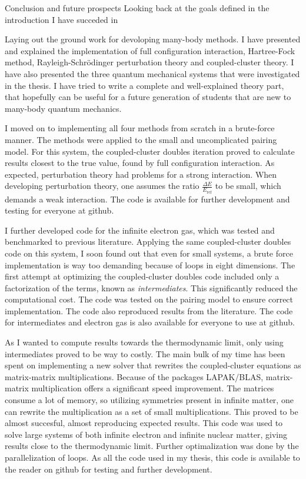 \documentclass[twoside,english]{uiofysmaster}
\begin{document}
\begin{chapter}{Conclusion and future prospects}
	Looking back at the goals defined in the introduction I have succeded in 

	Laying out the ground work for devoloping many-body methods. I have presented and explained the implementation of full configuration interaction, Hartree-Fock method, Rayleigh-Schr\"{o}dinger perturbation theory and coupled-cluster theory. I have also presented the three quantum mechanical systems that were investigated in the thesis. I have tried to write a complete and well-explained theory part, that hopefully can be useful for a future generation of students that are new to many-body quantum mechanics.  
 
	I moved on to implementing all four methods from scratch in a brute-force manner. The methods were applied to the small and uncomplicated pairing model. For this system, the coupled-cluster doubles iteration proved to calculate results closest to the true value, found by full configuration interaction. As expected, perturbation theory had problems for a strong interaction. When developing perturbation theory, one assumes the ratio $\frac{\Delta E}{E_{\text{ref}}}$ to be small, which demands a weak interaction. The code is available for further development and testing for everyone at github. 

	I further developed code for the infinite electron gas, which was tested and benchmarked to previous literature. Applying the same coupled-cluster doubles code on this system, I soon found out that even for small systems, a brute force implementation is way too demanding because of loops in eight dimensions. The first attempt at optimizing the coupled-cluster doubles code included only a factorization of the terms, known as \textit{intermediates}. This significantly reduced the computational cost. The code was tested on the pairing model to ensure correct implementation. The code also reproduced results from the literature. The code for intermediates and electron gas is also available for everyone to use at github. 

	As I wanted to compute results towards the thermodynamic limit, only using intermediates proved to be way to costly. The main bulk of my time has been spent on implementing a new solver that rewrites the coupled-cluster equations as matrix-matrix multiplications. Because of the packages LAPAK/BLAS, matrix-matrix multiplication offers a significant speed improvement. The matrices consume a lot of memory, so utilizing symmetries present in infinite matter, one can rewrite the multiplication as a set of small multiplications. This proved to be almost succesful, almost reproducing expected results. This code was used to solve large systems of both infinite electron and infinite nuclear matter, giving results close to the thermodynamic limit. Further optimalization was done by the parallelization of loops. As all the code used in my thesis, this code is available to the reader on github for testing and further development. 


\end{chapter}
\end{document}
